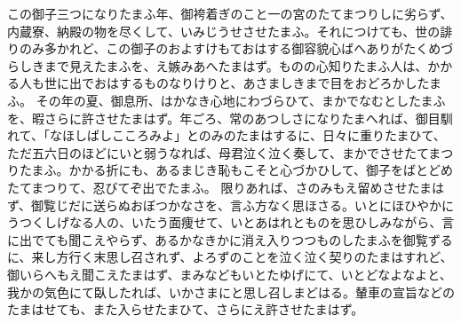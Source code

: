 \documentclass[a4paper,11pt]{TUmemorandum}
\begin{document}
この御子三つになりたまふ年、御袴着ぎのこと一の宮のたてまつりしに劣らず、内蔵寮、納殿の物を尽くして、いみじうせさせたまふ。それにつけても、世の誹りのみ多かれど、この御子のおよすけもておはする御容貌心ばへありがたくめづらしきまで見えたまふを、え嫉みあへたまはず。ものの心知りたまふ人は、かかる人も世に出でおはするものなりけりと、あさましきまで目をおどろかしたまふ。
その年の夏、御息所、はかなき心地にわづらひて、まかでなむとしたまふを、暇さらに許させたまはず。年ごろ、常のあつしさになりたまへれば、御目馴れて、「なほしばしこころみよ」とのみのたまはするに、日々に重りたまひて、ただ五六日のほどにいと弱うなれば、母君泣く泣く奏して、まかでさせたてまつりたまふ。かかる折にも、あるまじき恥もこそと心づかひして、御子をばとどめたてまつりて、忍びてぞ出でたまふ。
限りあれば、さのみもえ留めさせたまはず、御覧じだに送らぬおぼつかなさを、言ふ方なく思ほさる。いとにほひやかにうつくしげなる人の、いたう面痩せて、いとあはれとものを思ひしみながら、言に出でても聞こえやらず、あるかなきかに消え入りつつものしたまふを御覧ずるに、来し方行く末思し召されず、よろずのことを泣く泣く契りのたまはすれど、御いらへもえ聞こえたまはず、まみなどもいとたゆげにて、いとどなよなよと、我かの気色にて臥したれば、いかさまにと思し召しまどはる。輦車の宣旨などのたまはせても、また入らせたまひて、さらにえ許させたまはず。
\printbibliography
%
\end{document}
